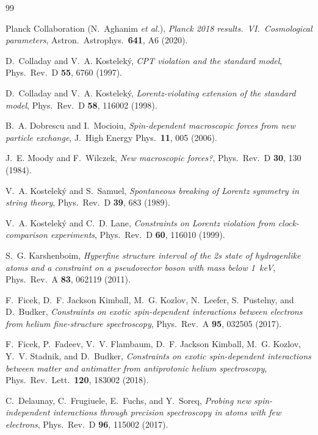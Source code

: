 \documentclass[12pt,a4paper]{report}
\begin{document}
\begin{thebibliography}{99}

Planck Collaboration (N.~Aghanim \textit{et al.}),
\textit{Planck 2018 results.\ VI.\ Cosmological parameters},
Astron.\ Astrophys.\ \textbf{641}, A6 (2020).

D.~Colladay and V.~A. Kostelek\'{y},
\textit{CPT violation and the standard model},
Phys.\ Rev.\ D \textbf{55}, 6760 (1997).

D.~Colladay and V.~A. Kostelek\'{y},
\textit{Lorentz-violating extension of the standard model},
Phys.\ Rev.\ D \textbf{58}, 116002 (1998).

B.~A. Dobrescu and I.~Mocioiu,
\textit{Spin-dependent macroscopic forces from new particle exchange},
J.\ High Energy Phys.\ \textbf{11}, 005 (2006).

J.~E. Moody and F.~Wilczek,
\textit{New macroscopic forces?},
Phys.\ Rev.\ D \textbf{30}, 130 (1984).

V.~A. Kostelek\'{y} and S.~Samuel,
\textit{Spontaneous breaking of Lorentz symmetry in string theory},
Phys.\ Rev.\ D \textbf{39}, 683 (1989).

V.~A. Kostelek\'{y} and C.~D. Lane,
\textit{Constraints on Lorentz violation from clock-comparison experiments},
Phys.\ Rev.\ D \textbf{60}, 116010 (1999).

S.~G. Karshenboim,
\textit{Hyperfine structure interval of the 2s state of hydrogenlike atoms
and a constraint on a pseudovector boson with mass below 1~keV},
Phys.\ Rev.\ A \textbf{83}, 062119 (2011).

F.~Ficek, D.~F. Jackson Kimball, M.~G. Kozlov, N.~Leefer, S.~Pustelny, and
D.~Budker,
\textit{Constraints on exotic spin-dependent interactions between electrons
from helium fine-structure spectroscopy},
Phys.\ Rev.\ A \textbf{95}, 032505 (2017).

F.~Ficek, P.~Fadeev, V.~V. Flambaum, D.~F. Jackson Kimball, M.~G. Kozlov,
Y.~V. Stadnik, and D.~Budker,
\textit{Constraints on exotic spin-dependent interactions between matter and
antimatter from antiprotonic helium spectroscopy},
Phys.\ Rev.\ Lett.\ \textbf{120}, 183002 (2018).

C.~Delaunay, C.~Frugiuele, E.~Fuchs, and Y.~Soreq,
\textit{Probing new spin-independent interactions through precision
spectroscopy in atoms with few electrons},
Phys.\ Rev.\ D \textbf{96}, 115002 (2017).


\end{thebibliography}
\end{document}
